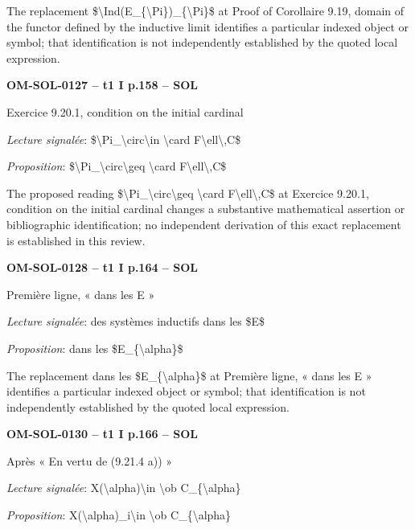 The replacement \$\textbackslash{}Ind(E\_\{\textbackslash{}Pi\})\_\{\textbackslash{}Pi\}\$ at Proof of Corollaire 9.19, domain of the functor defined by the inductive limit identifies a particular indexed object or symbol; that identification is not independently established by the quoted local expression.\par
\par\noindent\textbf{OM-SOL-0127 -- t1 I p.158 -- SOL}\par
Exercice 9.20.1, condition on the initial cardinal\par
\emph{Lecture signalée}: \$\textbackslash{}Pi\_\textbackslash{}circ\textbackslash{}in \textbackslash{}card F\textbackslash{}ell\textbackslash{},C\$\par
\emph{Proposition}: \$\textbackslash{}Pi\_\textbackslash{}circ\textbackslash{}geq \textbackslash{}card F\textbackslash{}ell\textbackslash{},C\$\par
The proposed reading \$\textbackslash{}Pi\_\textbackslash{}circ\textbackslash{}geq \textbackslash{}card F\textbackslash{}ell\textbackslash{},C\$ at Exercice 9.20.1, condition on the initial cardinal changes a substantive mathematical assertion or bibliographic identification; no independent derivation of this exact replacement is established in this review.\par
\par\noindent\textbf{OM-SOL-0128 -- t1 I p.164 -- SOL}\par
Première ligne, « dans les E »\par
\emph{Lecture signalée}: des systèmes inductifs dans les \$E\$\par
\emph{Proposition}: dans les \$E\_\{\textbackslash{}alpha\}\$\par
The replacement dans les \$E\_\{\textbackslash{}alpha\}\$ at Première ligne, « dans les E » identifies a particular indexed object or symbol; that identification is not independently established by the quoted local expression.\par
\par\noindent\textbf{OM-SOL-0130 -- t1 I p.166 -- SOL}\par
Après « En vertu de (9.21.4 a)) »\par
\emph{Lecture signalée}: X(\textbackslash{}alpha)\textbackslash{}in \textbackslash{}ob C\_\{\textbackslash{}alpha\}\par
\emph{Proposition}: X(\textbackslash{}alpha)\_i\textbackslash{}in \textbackslash{}ob C\_\{\textbackslash{}alpha\}\par
